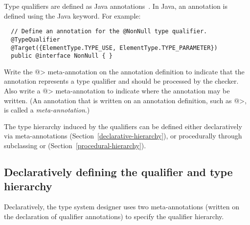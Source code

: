 
Type qualifiers are defined as Java annotations~\cite{JSR269}.  In Java, an
annotation is defined using the Java  keyword.
For example:

\begin{Verbatim}
  // Define an annotation for the @NonNull type qualifier.
  @TypeQualifier
  @Target({ElementType.TYPE_USE, ElementType.TYPE_PARAMETER})
  public @interface NonNull { }
\end{Verbatim}

\noindent
Write the \<@> meta-annotation on the annotation definition
to indicate that the annotation represents a type qualifier
and should be processed by the checker.
Also write a \<@>
meta-annotation to indicate where the annotation may be written.
(An annotation that is written on an annotation
definition, such as \<@>, is called a \emph{meta-annotation}.)


The type hierarchy induced by the qualifiers can be defined either
declaratively via meta-annotations (Section~\ref{declarative-hierarchy}), or procedurally through
subclassing  or
 (Section~\ref{procedural-hierarchy}).


\subsection{Declaratively defining the qualifier and type hierarchy\label{declarative-hierarchy}}

Declaratively, the type system designer uses two meta-annotations (written
on the declaration of qualifier annotations) to specify the qualifier
hierarchy.

